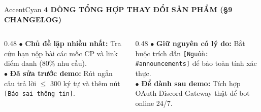 \documentclass[aspectratio=169,10pt]{beamer}
\begin{document}
\begin{frame}
  \vspace{0.2cm}
  \begin{glassbox}{AccentCyan}
    {\scriptsize \textbf{\color{AccentCyan}4 DÒNG TỔNG HỢP THAY ĐỔI SẢN PHẨM (§9 CHANGELOG)}}\\[0.1cm]
    \tiny
    \begin{columns}[T]
      \begin{column}{0.48\textwidth}
        $\bullet$ \textbf{Chủ đề lặp nhiều nhất:} Tra cứu hạn nộp bài các mốc CP và link điểm danh (80\% nhu cầu).\\
        $\bullet$ \textbf{Đã sửa trước demo:} Rút ngắn câu trả lời $\le$ 300 ký tự và thêm nút \texttt{[Báo sai thông tin]}.
      \end{column}
      \begin{column}{0.48\textwidth}
        $\bullet$ \textbf{Giữ nguyên có lý do:} Bắt buộc trích dẫn \texttt{[Nguồn: \#announcements]} để bảo toàn tính xác thực.\\
        $\bullet$ \textbf{Để dành sau demo:} Tích hợp OAuth Discord Gateway thật để bot online 24/7.
      \end{column}
    \end{columns}
  \end{glassbox}
\end{frame}
\end{document}
